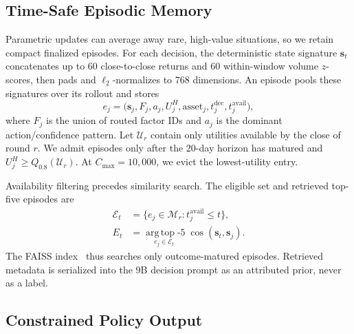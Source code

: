 \subsection{Time-Safe Episodic Memory}
\label{sec:belief}

Parametric updates can average away rare, high-value situations, so we retain compact finalized episodes. For each decision, the deterministic state signature $\mathbf s_t$ concatenates up to 60 close-to-close returns and 60 within-window volume $z$-scores, then pads and $\ell_2$-normalizes to 768 dimensions. An episode pools these signatures over its rollout and stores
\begin{equation}
\label{eq:episode_schema}
e_j=\bigl(\mathbf s_j,F_j,a_j,U_j^H,
\text{asset}_j,t_j^{\mathrm{dec}},t_j^{\mathrm{avail}}\bigr),
\end{equation}
where $F_j$ is the union of routed factor IDs and $a_j$ is the dominant action/confidence pattern. Let $\mathcal U_r$ contain only utilities available by the close of round $r$. We admit episodes only after the 20-day horizon has matured and $U_j^H\geq Q_{0.8}(\mathcal U_r)$. At $C_{\max}=10{,}000$, we evict the lowest-utility entry.

Availability filtering precedes similarity search. The eligible set and retrieved top-five episodes are
\begin{equation}
\label{eq:memory_score}
\begin{aligned}
\mathcal E_t&=\{e_j\in\mathcal M_r:t_j^{\mathrm{avail}}\leq t\},\\
E_t&=\underset{e_j\in\mathcal E_t}{\operatorname{arg\,top}\text{-}5}
\;\cos(\mathbf s_t,\mathbf s_j).
\end{aligned}
\end{equation}
The FAISS index~\cite{johnson2019billion} thus searches only outcome-matured episodes. Retrieved metadata is serialized into the 9B decision prompt as an attributed prior, never as a label.

\subsection{Constrained Policy Output}
\label{sec:policy_output}

